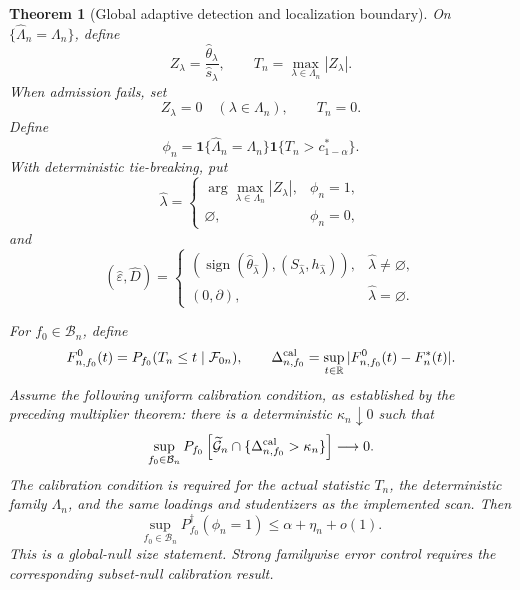 \documentclass[11pt]{article}
\newtheorem{theorem}{Theorem}[section]
\theoremstyle{definition}
\newcommand{\1}{\mathbf 1}\newcommand{\op}{\operatorname}
\begin{document}
\begin{theorem}[Global adaptive detection and localization boundary]
On \(\{\widehat\Lambda_n=\Lambda_n\}\), define
\[
Z_\lambda
=
\frac{\widehat\theta_\lambda}{\widehat s_\lambda},
\qquad
T_n
=
\max_{\lambda\in\Lambda_n}|Z_\lambda|.
\]
When admission fails, set
\[
Z_\lambda=0
\quad(\lambda\in\Lambda_n),
\qquad
T_n=0.
\]
Define
\[
\phi_n
=
\mathbf 1\{\widehat\Lambda_n=\Lambda_n\}
\mathbf 1\{T_n>c_{1-\alpha}^*\}.
\]
With deterministic tie-breaking, put
\[
\widehat\lambda
=
\begin{cases}
\displaystyle
\arg\max_{\lambda\in\Lambda_n}|Z_\lambda|,
&\phi_n=1,\\[2mm]
\varnothing,&\phi_n=0,
\end{cases}
\]
and
\[
(\widehat\varepsilon,\widehat D)
=
\begin{cases}
\left(
\operatorname{sign}(\widehat\theta_{\widehat\lambda}),
(S_{\widehat\lambda},h_{\widehat\lambda})
\right),
&\widehat\lambda\ne\varnothing,\\[1mm]
(0,\partial),
&\widehat\lambda=\varnothing.
\end{cases}
\]

For \(f_0\in\mathcal B_n\), define
\[
F_{n,f_0}^{0}(t)
=
P_{f_0}(T_n\le t\mid\mathcal F_{0n}),
\qquad
\Delta_{n,f_0}^{\rm cal}
=
\sup_{t\in\mathbb R}
|F_{n,f_0}^{0}(t)-F_n^*(t)|.
\]
Assume the following uniform calibration condition, as established
by the preceding multiplier theorem: there is a deterministic
\(\kappa_n\downarrow0\) such that
\begin{equation}
\sup_{f_0\in\mathcal B_n}
P_{f_0}\left[
\widetilde{\mathcal G}_n
\cap
\{\Delta_{n,f_0}^{\rm cal}>\kappa_n\}
\right]
\longrightarrow0.
\label{eq:t3-15}
\end{equation}
The calibration condition is required for the actual statistic
\(T_n\), the deterministic family \(\Lambda_n\), and the same
loadings and studentizers as the implemented scan.  Then
\begin{equation}
\sup_{f_0\in\mathcal B_n}
P_{f_0}^\dagger(\phi_n=1)
\le
\alpha+\eta_n+o(1).
\label{eq:t3-16}
\end{equation}
This is a global-null size statement.  Strong familywise error
control requires the corresponding subset-null calibration result.


\end{theorem}
\end{document}
